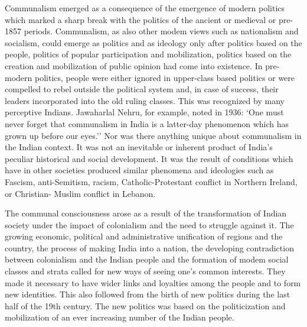 Communalism emerged as a consequence of the emergence of modern politics which marked a sharp break with the politics of the ancient or medieval or pre-1857 periods. Communalism, as also other modem views such as nationalism and socialism, could emerge as politics and as ideology only after politics based on the people, politics of popular participation and mobilization, politics based on the creation and mobilization of public opinion had come into existence. In pre-modern politics, people were either ignored in upper-class based politics or were compelled to rebel outside the political system and, in case of success, their leaders incorporated into the old ruling classes. This was recognized by many perceptive Indians. Jawaharlal Nehru, for example, noted in 1936: `One must never forget that communalism in India is a latter-day phenomenon which has grown up before our eyes.'' Nor was there anything unique about communalism in the Indian context. It was not an inevitable or inherent product of India's peculiar historical and social development. It was the result of conditions which have in other societies produced similar phenomena and ideologies such as Fascism, anti-Semitism, racism, Catholic-Protestant conflict in Northern Ireland, or Christian- Muslim conflict in Lebanon. 

The communal consciousness arose as a result of the transformation of Indian society under the impact of colonialism and the need to struggle against it. The growing economic, political and administrative unification of regions and the country, the process of making India into a nation, the developing contradiction between colonialism and the Indian people and the formation of modem social classes and strata called for new ways of seeing one's common interests. They made it necessary to have wider links and loyalties among the people and to form new identities. This also followed from the birth of new politics during the last half of the 19th century. The new politics was based on the politicization and mobilization of an ever increasing number of the Indian people. 

